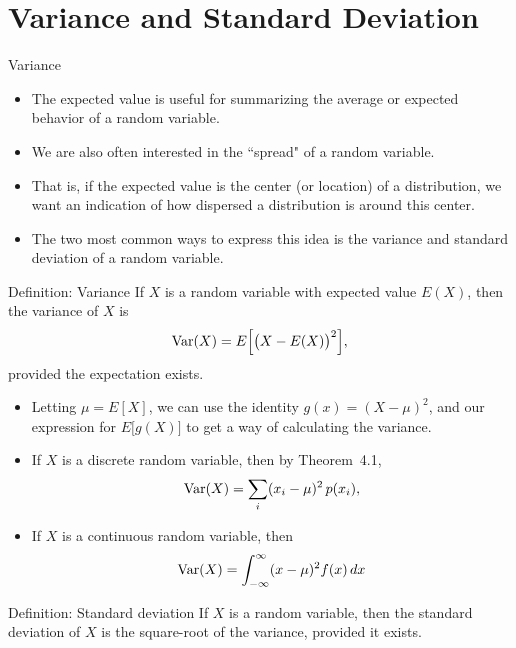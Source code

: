 \section{Variance and Standard Deviation}

\begin{frame}[allowframebreaks]{Variance}
  \begin{itemize}
    \item The expected value is useful for summarizing the average or expected behavior of a random variable.
    \item We are also often interested in the ``spread" of a random variable.
    \item That is, if the expected value is the center (or location) of a distribution, we want an indication of how dispersed a distribution is around this center.
    \item The two most common ways to express this idea is the \alert{variance} and \alert{standard deviation} of a random variable.
  \end{itemize}
  
  \framebreak
  
  \begin{block}{Definition: Variance}
    If $X$ is a random variable with expected value $E(X)$, then the \alert{variance} of $X$ is
    $$
    \mathrm{Var}(X) = E\Big[\big(X - E(X)\big)^2\Big],
    $$
    provided the expectation exists.
  \end{block}
  
  \framebreak
  
  \begin{itemize}
    
    \item Letting $\mu = E[X]$, we can use the identity $g(x) = (X - \mu)^2$, and our expression for $E\big[g(X)\big]$ to get a way of calculating the variance.
  
    \item If $X$ is a discrete random variable, then by Theorem~4.1, 
    $$
    \mathrm{Var}(X) = \sum_{i}(x_i - \mu)^2\,p(x_i),
    $$
    \item If $X$ is a continuous random variable, then
    $$
    \mathrm{Var}(X) = \int_{-\infty}^\infty (x- \mu)^2 f(x)\, dx
    $$
  \end{itemize}
  
  \framebreak
  
  \begin{block}{Definition: Standard deviation}
    If $X$ is a random variable, then the standard deviation of $X$ is the square-root of the variance, provided it exists. 
  \end{block}
  

\end{frame}
